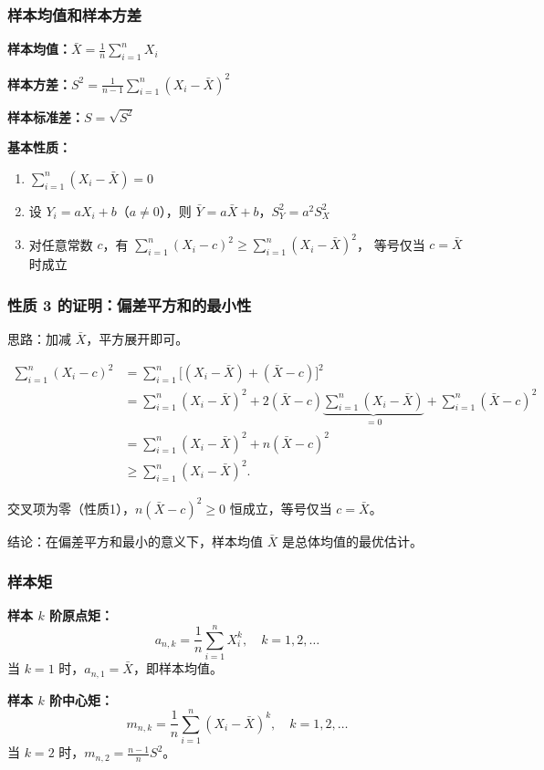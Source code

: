 \documentclass[11pt]{beamer}
\begin{document}
\begin{frame}
    \frametitle{样本均值和样本方差}
    \small
    \textbf{样本均值：}$\displaystyle \bar{X} = \frac{1}{n}\sum_{i=1}^n X_i$

    \textbf{样本方差：}$\displaystyle S^2 = \frac{1}{n-1}\sum_{i=1}^n (X_i - \bar{X})^2$

    \textbf{样本标准差：}$S = \sqrt{S^2}$

    \pause
    \vspace{0.3em}
    \textbf{基本性质：}
    \begin{enumerate}
        \item $\sum_{i=1}^n (X_i - \bar{X}) = 0$
        \item 设 $Y_i = aX_i + b$（$a \neq 0$），则
            $\bar{Y} = a\bar{X} + b$，$S_Y^2 = a^2 S_X^2$
        \item 对任意常数 $c$，有
            $\sum_{i=1}^n (X_i - c)^2 \ge \sum_{i=1}^n (X_i - \bar{X})^2$，
            等号仅当 $c = \bar{X}$ 时成立
    \end{enumerate}
\end{frame}

\begin{frame}
    \frametitle{性质 3 的证明：偏差平方和的最小性}
    \small
    思路：加减 $\bar{X}$，平方展开即可。

    \begin{align*}
        \sum_{i=1}^n (X_i - c)^2 &= \sum_{i=1}^n \bigl[(X_i - \bar{X}) + (\bar{X} - c)\bigr]^2 \\
        &= \sum_{i=1}^n (X_i - \bar{X})^2 + 2(\bar{X} - c)\underbrace{\sum_{i=1}^n (X_i - \bar{X})}_{=0} + \sum_{i=1}^n (\bar{X} - c)^2 \\
        &= \sum_{i=1}^n (X_i - \bar{X})^2 + n(\bar{X} - c)^2 \\
        &\ge \sum_{i=1}^n (X_i - \bar{X})^2.
    \end{align*}

    \pause
    交叉项为零（性质1），$n(\bar{X} - c)^2 \ge 0$ 恒成立，等号仅当 $c = \bar{X}$。

    结论：在偏差平方和最小的意义下，样本均值 $\bar{X}$ 是总体均值的最优估计。
\end{frame}

\begin{frame}
    \frametitle{样本矩}
    \small
    \textbf{样本 $k$ 阶原点矩：}
    \[
        a_{n,k} = \frac{1}{n}\sum_{i=1}^n X_i^k, \quad k = 1,2,\ldots
    \]
    当 $k = 1$ 时，$a_{n,1} = \bar{X}$，即样本均值。

    \pause
    \vspace{0.3em}
    \textbf{样本 $k$ 阶中心矩：}
    \[
        m_{n,k} = \frac{1}{n}\sum_{i=1}^n (X_i - \bar{X})^k, \quad k = 1,2,\ldots
    \]
    当 $k = 2$ 时，$m_{n,2} = \frac{n-1}{n}S^2$。
\end{frame}
\end{document}
